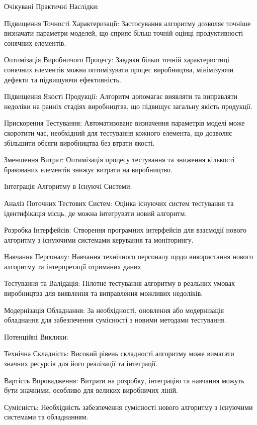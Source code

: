 \documentclass[a4paper,fleqn]{cas-sc}
\begin{document}
Очікувані Практичні Наслідки:

    Підвищення Точності Характеризації:
        Застосування алгоритму дозволяє точніше визначати параметри моделей, що сприяє більш точній оцінці продуктивності сонячних елементів.

    Оптимізація Виробничого Процесу:
        Завдяки більш точній характеристиці сонячних елементів можна оптимізувати процес виробництва, мінімізуючи дефекти та підвищуючи ефективність.

    Підвищення Якості Продукції:
        Алгоритм допомагає виявляти та виправляти недоліки на ранніх стадіях виробництва, що підвищує загальну якість продукції.

    Прискорення Тестування:
        Автоматизоване визначення параметрів моделі може скоротити час, необхідний для тестування кожного елемента, що дозволяє збільшити обсяги виробництва без втрати якості.

    Зменшення Витрат:
        Оптимізація процесу тестування та зниження кількості бракованих елементів знижує витрати на виробництво.

Інтеграція Алгоритму в Існуючі Системи:

    Аналіз Поточних Тестових Систем:
        Оцінка існуючих систем тестування та ідентифікація місць, де можна інтегрувати новий алгоритм.

    Розробка Інтерфейсів:
        Створення програмних інтерфейсів для взаємодії нового алгоритму з існуючими системами керування та моніторингу.

    Навчання Персоналу:
        Навчання технічного персоналу щодо використання нового алгоритму та інтерпретації отриманих даних.

    Тестування та Валідація:
        Пілотне тестування алгоритму в реальних умовах виробництва для виявлення та виправлення можливих недоліків.

    Модернізація Обладнання:
        За необхідності, оновлення або модернізація обладнання для забезпечення сумісності з новими методами тестування.

Потенційні Виклики:

    Технічна Складність:
        Високий рівень складності алгоритму може вимагати значних ресурсів для його реалізації та інтеграції.

    Вартість Впровадження:
        Витрати на розробку, інтеграцію та навчання можуть бути значними, особливо для великих виробничих ліній.

    Сумісність:
        Необхідність забезпечення сумісності нового алгоритму з існуючими системами та обладнанням.
\end{document}
